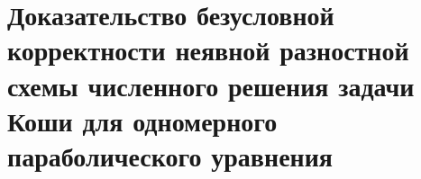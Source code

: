 \documentclass[__main__.tex]{subfiles}
\begin{document}
\section{Доказательство безусловной корректности неявной разностной схемы численного решения задачи Коши для одномерного параболического уравнения}
\end{document}
